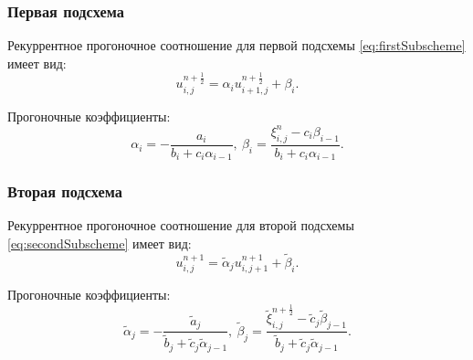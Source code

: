 \documentclass[12pt, a4paper]{report}
\begin{document}
	\subsubsection*{Первая подсхема}
	\large
	Рекуррентное прогоночное соотношение для первой подсхемы \eqref{eq:firstSubscheme} имеет вид:
	\begin{equation*}
		u_{i, j}^{n+\frac{1}{2}} = \alpha_{i}u_{i+1, j}^{n+\frac{1}{2}} + \beta_{i}.
	\end{equation*}
	\par
	Прогоночные коэффициенты:
	\begin{equation*}
		\alpha_{i} = -\frac{a_{i}}{b_{i} + c_{i}\alpha_{i-1}}, \> \beta_{i} = \frac{\xi_{i, j}^{n} - c_{i}\beta_{i-1}}{b_{i} + c_{i}\alpha_{i-1}}.
	\end{equation*}
	\subsubsection*{Вторая подсхема}
	\large
	Рекуррентное прогоночное соотношение для второй подсхемы \eqref{eq:secondSubscheme} имеет вид:
	\begin{equation*}
		u_{i, j}^{n+1} = \tilde{\alpha}_{j}u_{i, j+1}^{n+1} + \tilde{\beta}_{i}.
	\end{equation*}
	\par
	Прогоночные коэффициенты:
	\begin{equation*}
		\tilde{\alpha}_{j} = -\frac{\tilde{a}_{j}}{\tilde{b}_{j} + \tilde{c}_{j}\tilde{\alpha}_{j-1}}, \> \tilde{\beta}_{j} = \frac{\tilde{\xi}_{i, j}^{n+\frac{1}{2}} - \tilde{c}_{j}\tilde{\beta}_{j-1}}{\tilde{b}_{j} + \tilde{c}_{j}\tilde{\alpha}_{j-1}}.
	\end{equation*}
\end{document}
